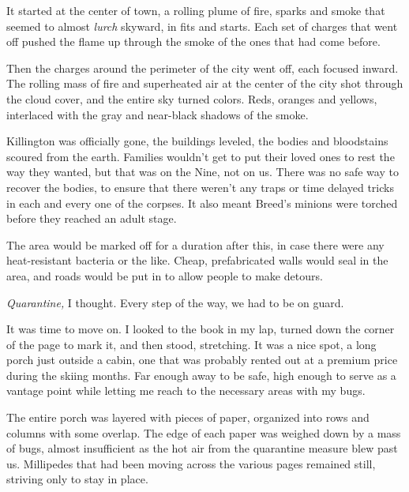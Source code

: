 





It started at the center of town, a rolling plume of fire, sparks and smoke that seemed to almost \emph{lurch} skyward, in fits and starts.  Each set of charges that went off pushed the flame up through the smoke of the ones that had come before.



Then the charges around the perimeter of the city went off, each focused inward.  The rolling mass of fire and superheated air at the center of the city shot through the cloud cover, and the entire sky turned colors.  Reds, oranges and yellows, interlaced with the gray and near-black shadows of the smoke.



Killington was officially gone, the buildings leveled, the bodies and bloodstains scoured from the earth.  Families wouldn't get to put their loved ones to rest the way they wanted, but that was on the Nine, not on us.  There was no safe way to recover the bodies, to ensure that there weren't any traps or time delayed tricks in each and every one of the corpses.  It also meant Breed's minions were torched before they reached an adult stage.



The area would be marked off for a duration after this, in case there were any heat-resistant bacteria or the like.  Cheap, prefabricated walls would seal in the area, and roads would be put in to allow people to make detours.



\emph{Quarantine,} I thought.  Every step of the way, we had to be on guard.



It was time to move on.  I looked to the book in my lap, turned down the corner of the page to mark it, and then stood, stretching.  It was a nice spot, a long porch just outside a cabin, one that was probably rented out at a premium price during the skiing months.  Far enough away to be safe, high enough to serve as a vantage point while letting me reach to the necessary areas with my bugs.



The entire porch was layered with pieces of paper, organized into rows and columns with some overlap.  The edge of each paper was weighed down by a mass of bugs, almost insufficient as the hot air from the quarantine measure blew past us.  Millipedes that had been moving across the various pages remained still, striving only to stay in place.



